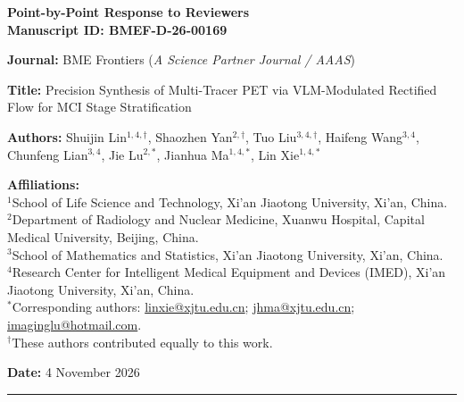 \documentclass[11pt]{article}
\begin{document}
\thispagestyle{empty}

\vspace*{0.8cm}
{\LARGE\bfseries\color{HeaderColor}
  Point-by-Point Response to Reviewers\\[6pt]
  \large\normalfont\color{black}
  Manuscript ID: \textbf{BMEF-D-26-00169}
}

\vspace{0.6cm}
\noindent\textbf{Journal:} BME Frontiers (\textit{A Science Partner Journal / AAAS})

\noindent\textbf{Title:} Precision Synthesis of Multi-Tracer PET via VLM-Modulated Rectified Flow for MCI Stage Stratification

\noindent\textbf{Authors:} Shuijin Lin$^{1,4,\dagger}$, Shaozhen Yan$^{2,\dagger}$, Tuo Liu$^{3,4,\dagger}$, Haifeng Wang$^{3,4}$, Chunfeng Lian$^{3,4}$, Jie Lu$^{2,*}$, Jianhua Ma$^{1,4,*}$, Lin Xie$^{1,4,*}$

\noindent\textbf{Affiliations:}\\
{\small
$^1$School of Life Science and Technology, Xi'an Jiaotong University, Xi'an, China.\\
$^2$Department of Radiology and Nuclear Medicine, Xuanwu Hospital, Capital Medical University, Beijing, China.\\
$^3$School of Mathematics and Statistics, Xi'an Jiaotong University, Xi'an, China.\\
$^4$Research Center for Intelligent Medical Equipment and Devices (IMED), Xi'an Jiaotong University, Xi'an, China.\\
$^*$Corresponding authors: \href{mailto:linxie@xjtu.edu.cn}{linxie@xjtu.edu.cn}; \href{mailto:jhma@xjtu.edu.cn}{jhma@xjtu.edu.cn}; \href{mailto:imaginglu@hotmail.com}{imaginglu@hotmail.com}.\\
$^\dagger$These authors contributed equally to this work.
}

\noindent\textbf{Date:} 4 November 2026

\vspace{0.8cm}
\noindent\rule{\linewidth}{1.2pt}



\clearpage


\clearpage


\clearpage


\clearpage


\clearpage


\end{document}
